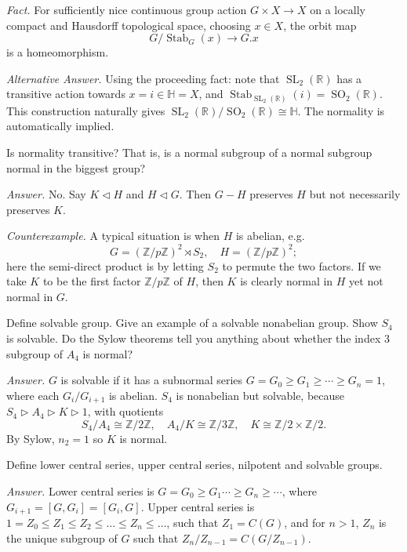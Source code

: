 \documentclass{mathproblems}
\newcommand\R{\mathbb{R}}
\newcommand\Z{\mathbb{Z}}
\begin{document}
\begin{questions}
{\color{violet}
\textit{Fact.} For sufficiently nice continuous group action $G\times X\to X$ on a locally compact and Hausdorff topological space, choosing $x\in X$, the orbit map
$$
G/\operatorname{Stab}_G (x)\longrightarrow G.x
$$
is a homeomorphism.
}

\textit{Alternative Answer.}
Using the proceeding fact: note that $\operatorname{SL}_2(\R)$ has a transitive action towards $x=i\in \mathbb{H}=X$, and $\operatorname{Stab}_{\operatorname{SL}_2(\R)} (i)=\operatorname{SO}_2(\R)$. This construction naturally gives $\operatorname{SL}_2(\R)/\operatorname{SO}_2(\R)\cong \mathbb{H}$. The normality is automatically implied.


\miquestion
{\color{blue} Is normality transitive? That is, is a normal subgroup of a normal subgroup normal in the biggest group?}

\textit{Answer.} No. Say $K\triangleleft H$ and $H\triangleleft G$. Then $G-H$ preserves $H$ but not necessarily preserves $K$.

\textit{Counterexample.} A typical situation is when $H$ is abelian, e.g. 
$$
G=(\Z/p\Z)^{2} \rtimes S_{2},\quad H=(\Z/p\Z)^{2};
$$
here the semi-direct product is by letting $S_{2}$ to permute the two factors. If we take $K$ to be the first factor $\Z/p\Z$ of $H$, then $K$ is clearly normal in $H$ yet not normal in $G$.


\miquestion
{\color{blue} Define solvable group. Give an example of a solvable nonabelian group. Show $S_4$ is solvable. Do the Sylow theorems tell you anything about whether the index 3 subgroup of $A_4$ is normal?}

\textit{Answer.} $G$ is solvable if it has a subnormal series $G=G_{0} \geq G_{1} \geq \cdots \geq G_{n}=1$, where each $G_i/G_{i+1}$ is abelian. $S_4$ is nonabelian but solvable, because $S_{4} \triangleright A_{4} \triangleright K \triangleright 1$, with quotients
$$
S_{4} / A_{4} \cong \Z / 2\Z, \quad A_{4} / K \cong \Z / 3\Z,\quad K \cong \Z / 2 \times \Z / 2.
$$
By Sylow, $n_2=1$ so $K$ is normal.


\miquestion
{\color{blue} Define lower central series, upper central series, nilpotent and solvable groups.}

\textit{Answer.} Lower central series is $G=G_0\geq G_1 \cdots \geq G_{n}\geq \cdots$, where $G_{i+1}=[G,G_i]=[G_i,G]$. Upper central series is $1=Z_{0} \leq Z_{1} \leq Z_{2} \leq \ldots \leq Z_{n} \leq \ldots$, such that $Z_{1}=C(G)$, and for $n>1$, $Z_{n}$ is the unique subgroup of $G$ such that $Z_{n} / Z_{n-1}=C(G / Z_{n-1})$.


\end{questions}
\end{document}
